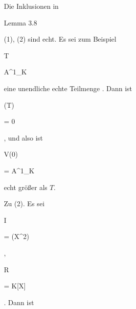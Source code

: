 {


Die Inklusionen in

Lemma 3.8

(1), (2) sind echt. Es sei zum Beispiel


\mavergleichskette


{\vergleichskette


{ T
}


{ \subset }{ {\mathbb A}^{1}_{K}
}


{  }{
}


{    }{
}


{   }{
}


}
{}{}{}
eine unendliche echte Teilmenge
 {} {.}
Dann ist


\mavergleichskette


{\vergleichskette


{  (T)
}


{ = }{ 0
}


{  }{
}


{    }{
}


{   }{
}


}
{}{}{,}
und also ist


\mavergleichskette


{\vergleichskette


{ V(0)
}


{ = }{ {\mathbb A}^{1}_{K}
}


{  }{
}


{    }{
}


{   }{
}


}
{}{}{}
echt größer als $T$.


Zu (2). Es sei


\mavergleichskette


{\vergleichskette


{ I
}


{ = }{ (X^2)
}


{  }{
}


{    }{
}


{   }{
}


}
{}{}{,}


\mavergleichskette


{\vergleichskette


{ R
}


{ = }{ K[X]
}


{  }{
}


{    }{
}


{   }{
}


}
{}{}{.}
Dann ist


}
